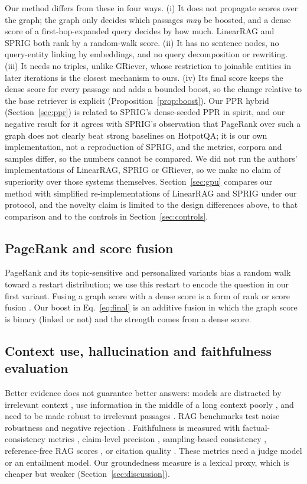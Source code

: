\documentclass[a4paper,fleqn]{cas-sc}
\begin{document}
Our method differs from these in four ways. (i) It does not propagate scores over the graph; the graph only decides which passages \emph{may} be boosted, and a dense score of a first-hop-expanded query decides by how much. LinearRAG and SPRIG both rank by a random-walk score. (ii) It has no sentence nodes, no query-entity linking by embeddings, and no query decomposition or rewriting. (iii) It needs no triples, unlike GRiever, whose restriction to joinable entities in later iterations is the closest mechanism to ours. (iv) Its final score keeps the dense score for every passage and adds a bounded boost, so the change relative to the base retriever is explicit (Proposition~\ref{prop:boost}). Our PPR hybrid (Section~\ref{sec:ppr}) is related to SPRIG's dense-seeded PPR in spirit, and our negative result for it agrees with SPRIG's observation that PageRank over such a graph does not clearly beat strong baselines on HotpotQA; it is our own implementation, not a reproduction of SPRIG, and the metrics, corpora and samples differ, so the numbers cannot be compared. We did not run the authors' implementations of LinearRAG, SPRIG or GRiever, so we make no claim of superiority over those systems themselves. Section~\ref{sec:gpu} compares our method with simplified re-implementations of LinearRAG and SPRIG under our protocol, and the novelty claim is limited to the design differences above, to that comparison and to the controls in Section~\ref{sec:controls}.

\subsection{PageRank and score fusion}
PageRank \citep{page1999pagerank} and its topic-sensitive and personalized variants \citep{haveliwala2002topic,jeh2003ppr} bias a random walk toward a restart distribution; we use this restart to encode the question in our first variant. Fusing a graph score with a dense score is a form of rank or score fusion \citep{cormack2009rrf}. Our boost in Eq.~\eqref{eq:final} is an additive fusion in which the graph score is binary (linked or not) and the strength comes from a dense score.

\subsection{Context use, hallucination and faithfulness evaluation}
Better evidence does not guarantee better answers: models are distracted by irrelevant context \citep{shi2023distracted}, use information in the middle of a long context poorly \citep{liu2024lost}, and need to be made robust to irrelevant passages \citep{yoran2024robust}. RAG benchmarks test noise robustness and negative rejection \citep{chen2024rgb}. Faithfulness is measured with factual-consistency metrics \citep{honovich2022true}, claim-level precision \citep{min2023factscore}, sampling-based consistency \citep{manakul2023selfcheck}, reference-free RAG scores \citep{es2024ragas}, or citation quality \citep{gao2023alce}. These metrics need a judge model or an entailment model. Our groundedness measure is a lexical proxy, which is cheaper but weaker (Section~\ref{sec:discussion}).
\end{document}
